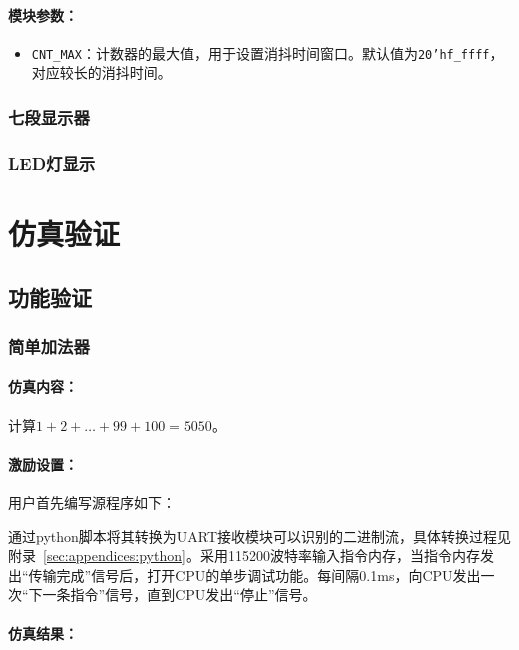\documentclass[lang=cn,a4paper,newtx]{elegantpaper}
\begin{document}
\paragraph{模块参数：}
\begin{itemize}
  \item \texttt{CNT\_MAX}：计数器的最大值，用于设置消抖时间窗口。默认值为\texttt{20'hf\_ffff}，对应较长的消抖时间。
\end{itemize}

\subsubsection{七段显示器}

\subsubsection{LED灯显示}

\section{仿真验证}
\subsection{功能验证}

\subsubsection{简单加法器}

\paragraph{仿真内容：}

计算$1+2+\dots +99 +100 =5050$。

\paragraph{激励设置：}

用户首先编写源程序如下：


通过python脚本将其转换为UART接收模块可以识别的二进制流，具体转换过程见附录~\ref{sec:appendices:python}。采用115200波特率输入指令内存，当指令内存发出“传输完成”信号后，打开CPU的单步调试功能。每间隔0.1ms，向CPU发出一次“下一条指令”信号，直到CPU发出“停止”信号。

\paragraph{仿真结果：}
\end{document}
